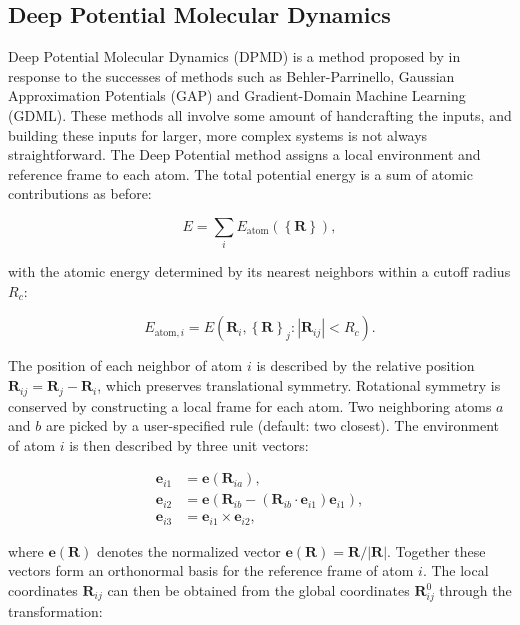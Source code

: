 \subsection{Deep Potential Molecular Dynamics}
Deep Potential Molecular Dynamics (DPMD) is a method
proposed by \parencite[Zhang et al.]{PhysRevLett.120.143001}
in response to the successes of methods such as Behler-Parrinello,
Gaussian Approximation Potentials (GAP\cite{PhysRevLett.104.136403})
and Gradient-Domain Machine Learning (GDML\cite{Chmielae1603015}).
These methods all involve some amount of handcrafting the inputs,
and building these inputs for larger, more complex systems is not
always straightforward.
The Deep Potential method assigns a local environment and reference
frame to each atom. The total potential energy is a sum
of atomic contributions as before:

\begin{equation}
 E = \sum_i E_{\text{atom}}\left( \left\{ \bm{R} \right\} \right),
\end{equation}

with the atomic energy determined by its nearest neighbors
within a cutoff radius $R_c$:

\begin{equation}
    E_{\text{atom},i} = E\left(\bm{R}_i,
    \left\{ \bm{R} \right\}_j : \left| \bm{R}_{ij}
    \right| < R_c \right) . 
\end{equation}

The position of each neighbor of atom $i$ is described
by the relative position $\bm{R}_{ij} = \bm{R}_j - \bm{R}_i$,
which preserves translational symmetry.
Rotational symmetry is conserved by constructing a local frame
for each atom. Two neighboring atoms $a$ and $b$ are picked by a
user-specified rule (default: two closest).
The environment of atom $i$ is then described by three unit vectors:

\begin{equation}
\begin{split}
    \bm{e}_{i1} &= \bm{e}(\bm{R}_{ia}) , \\
    \bm{e}_{i2} &= \bm{e}(\bm{R}_{ib} - (\bm{R}_{ib} \cdot \bm{e}_{i1})
    \bm{e}_{i1}) , \\
    \bm{e}_{i3} &= \bm{e}_{i1} \times \bm{e}_{i2} ,
\end{split}
\end{equation}

where $\bm{e}(\bm{R})$ denotes the normalized vector $\bm{e}(\bm{R})
    = \bm{R} / \left| \bm{R} \right|$. Together these vectors
form an orthonormal basis for the reference frame of atom $i$.
The local coordinates $\bm{R}_{ij}$
can then be obtained from the global coordinates $\bm{R}_{ij}^0$
through the transformation:

